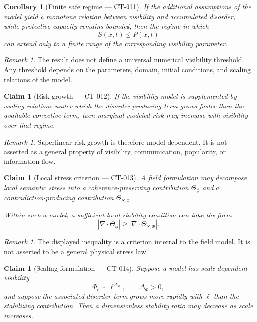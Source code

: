 \documentclass[11pt]{article}
\newtheorem{corollary}[theorem]{Corollary}
\newtheorem{claim}[theorem]{Claim}
\theoremstyle{definition}
\theoremstyle{remark}
\newtheorem{remark}[theorem]{Remark}
\begin{document}
\begin{corollary}[Finite safe regime --- CT-011]
If the additional assumptions of the model yield a monotone relation between
visibility and accumulated disorder, while protective capacity remains
bounded, then the regime in which
\[
  S(x,t)\leq P(x,t)
\]
can extend only to a finite range of the corresponding visibility parameter.
\end{corollary}

\begin{remark}
The result does not define a universal numerical visibility threshold. Any
threshold depends on the parameters, domain, initial conditions, and scaling
relations of the model.
\end{remark}

\begin{claim}[Risk growth --- CT-012]
If the visibility model is supplemented by scaling relations under which the
disorder-producing term grows faster than the available corrective term, then
marginal modeled risk may increase with visibility over that regime.
\end{claim}

\begin{remark}
Superlinear risk growth is therefore model-dependent. It is not asserted as a
general property of visibility, communication, popularity, or information
flow.
\end{remark}

\begin{claim}[Local stress criterion --- CT-013]
A field formulation may decompose local semantic stress into a
coherence-preserving contribution $\Theta_\phi$ and a
contradiction-producing contribution $\Theta_{S,\Phi}$.

Within such a model, a sufficient local stability condition can take the form
\[
  \left|
    \nabla\cdot\Theta_\phi
  \right|
  \geq
  \left|
    \nabla\cdot\Theta_{S,\Phi}
  \right|.
\]
\end{claim}

\begin{remark}
The displayed inequality is a criterion internal to the field model. It is
not asserted to be a general physical stress law.
\end{remark}

\begin{claim}[Scaling formulation --- CT-014]
Suppose a model has scale-dependent visibility
\[
  \Phi_\ell
  \sim
  \ell^{\Delta_\Phi},
  \qquad
  \Delta_\Phi>0,
\]
and suppose the associated disorder term grows more rapidly with $\ell$ than
the stabilizing contribution. Then a dimensionless stability ratio may
decrease as scale increases.
\end{claim}
\end{document}
